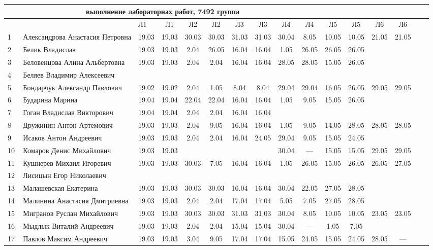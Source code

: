 \documentclass[a4paper,11pt]{article}
\begin{document}
%
\hspace{-6.1cm} %
\begin{tabular}{l|llccccccccccccc}
\multicolumn{10}{c}{выполнение лабораторнах работ, 7492 группа} \\
\toprule
&&Л1&Л1& Л2&Л2& Л3&Л3& Л4&Л4& Л5&Л5& Л6&Л6& \\
1\,&Александрова Анастасия Петровна &19.03&19.03 &30.03&30.03 &31.03&31.03&30.04& 8.05&10.05&10.05&21.05&21.05\\
2\,&Белик Владислав                 &19.03&19.03 & 2.04&26.05&16.04&16.04& 1.05&26.05&26.05&26.05\\
3\,&Беловенцова Алина Альбертовна   &19.03&19.03 &2.04&2.04  &16.04&16.04&28.05&28.05&15.05&26.05\\
4\,&Беляев Владимир Алексеевич      &&&&&&&&\\
5\,&Бондарчук Александр Павлович    &19.02&19.02 &2.04& 1.05  & 8.04& 8.04&29.04&29.04&16.05&26.05&29.05&29.05\\
\midrule
6\,&Бударина Марина                 &19.04&19.04 &22.04&22.04 &16.04&16.04& 1.05& 9.05&15.05&26.05\\
7\,&Гоган Владислав Викторович      &19.04&19.04 &2.04&2.04   &16.04&16.04&&\\
8\,&Дружинин Антон Артемович        &19.03&19.03 &2.04&9.05   &16.04&16.04& 1.05& 9.05&14.05&28.05&28.05&28.05\\
9\,&Исаков Антон Андреевич          &19.03&19.03 &2.04&2.04   &16.04&24.05&29.04& 9.05&15.05&24.05\\
10\,&Комаров Денис Михайлович       &19.03&19.03 &    &       &     &     &30.04& --- &15.05&15.05&29.05&29.05\\
\midrule
11\,&Кушнерев Михаил Игоревич       &19.03&19.03 &30.03& 7.05 &16.04&16.04& 1.05&26.05&15.05&26.05&26.05&27.05\\
12\,&Лисицын Егор Николаевич        &&&&&&&&\\
13\,&Малашевская Екатерина          &19.03&19.03 &30.03&30.03 &16.04&16.04&30.04&22.05&27.05&28.05\\
14\,&Малинина Анастасия Дмитриевна  &19.03&19.03 &2.04&2.04   &17.04&17.04& 5.05& 7.05&27.05&28.05\\
15\,&Мигранов Руслан Михайлович     &19.03&19.03 &30.03&30.03 &31.03&31.03&30.04& 8.05&10.05&10.05&23.05&23.05\\
\midrule
16\,&Мыдлык Виталий Андреевич       &19.03&19.03 &2.04&2.04   &15.04&15.04&30.04& --- & 1.05& 7.05\\
17\,&Павлов Максим Андреевич        &19.03&19.03 &3.04&9.05   &17.04&17.04&15.05&24.05&15.05&24.05&28.05& ---\\

\end{tabular}
\end{document}

